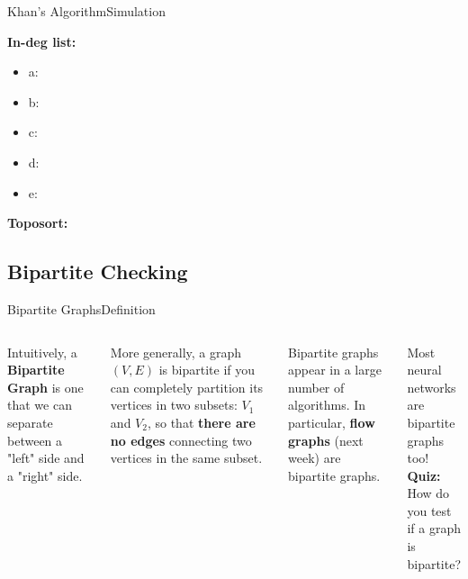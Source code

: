 \begin{frame}{Khan's Algorithm}{Simulation}
  \begin{center}
    
  \end{center}
  {\bf In-deg list:}
  \begin{itemize}
    \item a:
    \item b:
    \item c:
    \item d:
    \item e:
  \end{itemize}
  {\bf Toposort:}
\end{frame}

%
%
%

\subsection{Bipartite Checking}
\begin{frame}{Bipartite Graphs}{Definition}
  \begin{columns}
      Intuitively, a {\bf Bipartite Graph} is one that we can separate between a "left" side and a "right" side.\bigskip

      More generally, a graph $(V,E)$ is bipartite if you can completely partition its vertices in two subsets: $V_1$ and $V_2$, so that {\bf there are no edges} connecting two vertices in the same subset.\bigskip

      Bipartite graphs appear in a large number of algorithms. In particular, {\bf flow graphs} (next week) are bipartite graphs.\bigskip

      Most neural networks are bipartite graphs too!\\
      {\bf Quiz:} How do you test if a graph is bipartite?
    
  \end{columns}
\end{frame}

